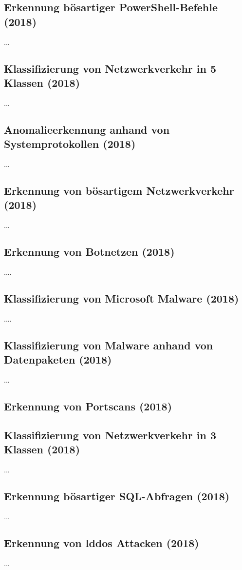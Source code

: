 \documentclass[
    12pt, %
    DIV10,
    ngerman, %
    a4paper, %
    oneside, %
    titlepage, %
    parskip=half, %
    headings=normal, %
    listof=totoc, %
    bibliography=totoc, %
    index=totoc, %
    captions=tableheading, %
    final %
]{scrreprt}
\begin{document}
\subsection{Erkennung bösartiger PowerShell-Befehle (2018)}
\textcite{Hendler2018}...
%
\subsection{Klassifizierung von Netzwerkverkehr in 5 Klassen (2018)}
\textcite{Ding2018}...
%
\subsection{Anomalieerkennung anhand von Systemprotokollen (2018)}
\textcite{Brown2018}...
%
\subsection{Erkennung von bösartigem Netzwerkverkehr (2018)}
\textcite{Aldwairi2018}...
%
\subsection{Erkennung von Botnetzen (2018)}
\textcite{Mathur2018}....
%
\subsection{Klassifizierung von Microsoft Malware (2018)}
\textcite{Sabar2018}....
%
\subsection{Klassifizierung von Malware anhand von Datenpaketen (2018)}
\textcite{Yeo2018}...
%
\subsection{Erkennung von Portscans (2018)}
\textcite{Aksu2019}
%
\subsection{Klassifizierung von Netzwerkverkehr in 3 Klassen (2018)}
\textcite{Teoh2018}...
%
\subsection{Erkennung bösartiger SQL-Abfragen (2018)}
\textcite{Jayaprakash2018}...
%
\subsection{Erkennung von \ac{lddos} Attacken (2018)}
\textcite{siracusano2018detection}...
%
\end{document}
